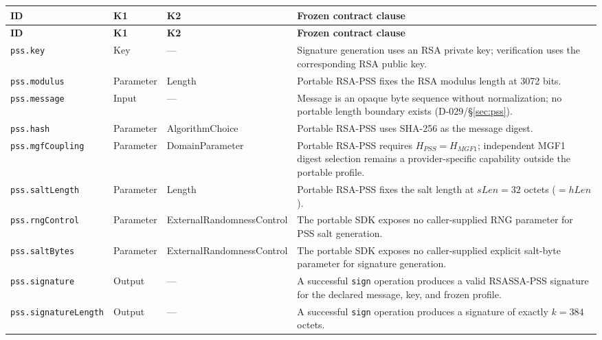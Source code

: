 \documentclass[11pt,a4paper]{article}
\begin{document}
\begin{longtable}{p{}p{}p{}p{}}
\toprule
\textbf{ID} & \textbf{K1} & \textbf{K2} & \textbf{Frozen contract clause}\\
\midrule
\endfirsthead
\toprule
\textbf{ID} & \textbf{K1} & \textbf{K2} & \textbf{Frozen contract clause}\\
\midrule
\endhead

\texttt{pss.key} &
Key &
--- &
Signature generation uses an RSA private key; verification uses the corresponding RSA public key.\\

\texttt{pss.modulus} &
Parameter &
Length &
Portable RSA-PSS fixes the RSA modulus length at 3072 bits.\\

\texttt{pss.message} &
Input &
--- &
Message is an opaque byte sequence without normalization; no portable length boundary exists (D-029/\S\ref{sec:pss}).\\

\texttt{pss.hash} &
Parameter &
AlgorithmChoice &
Portable RSA-PSS uses SHA-256 as the message digest.\\

\texttt{pss.mgfCoupling} &
Parameter &
DomainParameter &
Portable RSA-PSS requires $H_{PSS}=H_{MGF1}$; independent MGF1 digest selection remains a provider-specific capability outside the portable profile.\\

\texttt{pss.saltLength} &
Parameter &
Length &
Portable RSA-PSS fixes the salt length at $sLen=32$ octets ($=hLen$).\\

\texttt{pss.rngControl} &
Parameter &
ExternalRandomnessControl &
The portable SDK exposes no caller-supplied RNG parameter for PSS salt generation.\\

\texttt{pss.saltBytes} &
Parameter &
ExternalRandomnessControl &
The portable SDK exposes no caller-supplied explicit salt-byte parameter for signature generation.\\

\texttt{pss.signature} &
Output &
--- &
A successful \texttt{sign} operation produces a valid RSASSA-PSS signature for the declared message, key, and frozen profile.\\

\texttt{pss.signatureLength} &
Output &
--- &
A successful \texttt{sign} operation produces a signature of exactly $k=384$ octets.\\


\end{longtable}
\end{document}
